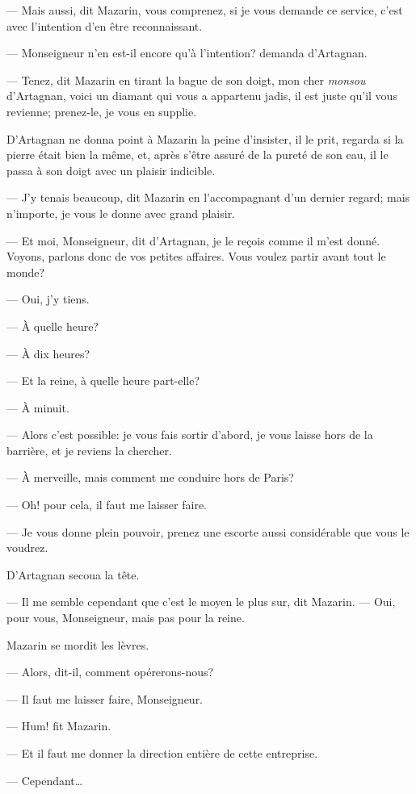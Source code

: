 — Mais aussi, dit Mazarin, vous comprenez, si je vous demande ce service, c'est avec l'intention d'en être reconnaissant.

— Monseigneur n'en est-il encore qu'à l'intention? demanda d'Artagnan.

— Tenez, dit Mazarin en tirant la bague de son doigt, mon cher \textit{monsou} d'Artagnan, voici un diamant qui vous a appartenu jadis, il est juste qu'il vous revienne; prenez-le, je vous en supplie.

D'Artagnan ne donna point à Mazarin la peine d'insister, il le prit, regarda si la pierre était bien la même, et, après s'être assuré de la pureté de son eau, il le passa à son doigt avec un plaisir indicible.

— J'y tenais beaucoup, dit Mazarin en l'accompagnant d'un dernier regard; mais n'importe, je vous le donne avec grand plaisir.

— Et moi, Monseigneur, dit d'Artagnan, je le reçois comme il m'est donné. Voyons, parlons donc de vos petites affaires. Vous voulez partir avant tout le monde?

— Oui, j'y tiens.

— À quelle heure?

— À dix heures?

— Et la reine, à quelle heure part-elle?

— À minuit.

— Alors c'est possible: je vous fais sortir d'abord, je vous laisse hors de la barrière, et je reviens la chercher.

— À merveille, mais comment me conduire hors de Paris?

— Oh! pour cela, il faut me laisser faire.

— Je vous donne plein pouvoir, prenez une escorte aussi considérable que vous le voudrez.

D'Artagnan secoua la tête.

— Il me semble cependant que c'est le moyen le plus sur, dit Mazarin.
— Oui, pour vous, Monseigneur, mais pas pour la reine.

Mazarin se mordit les lèvres.

— Alors, dit-il, comment opérerons-nous?

— Il faut me laisser faire, Monseigneur.

— Hum! fit Mazarin.

— Et il faut me donner la direction entière de cette entreprise.

— Cependant\dots

